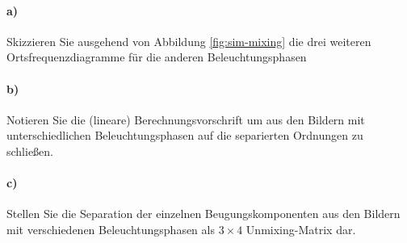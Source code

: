\documentclass{article}
\begin{document}
\paragraph{a)} 
Skizzieren Sie ausgehend von Abbildung \ref{fig:sim-mixing} die
drei weiteren Ortsfrequenzdiagramme f\"ur die anderen Beleuchtungsphasen 

\paragraph{b)}
Notieren Sie die (lineare) Berechnungsvorschrift um aus den Bildern
mit unterschiedlichen Beleuchtungsphasen auf die separierten Ordnungen
zu schlie\ss en.

\paragraph{c)}
Stellen Sie die Separation der einzelnen Beugungskomponenten aus den
Bildern mit verschiedenen Beleuchtungsphasen als $3\times 4$
Unmixing-Matrix dar.



\end{document}
